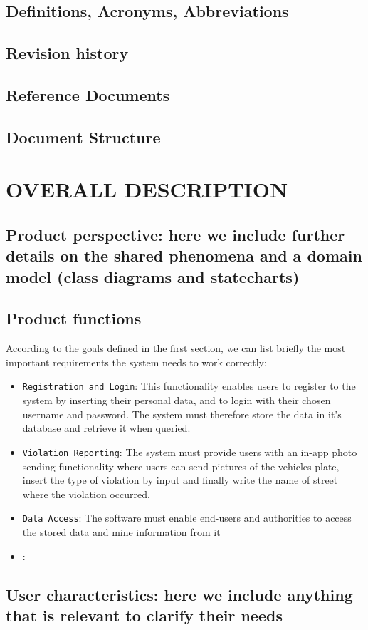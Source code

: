 \documentclass[12pt,a4paper]{article}
\begin{document}
\subsection{Definitions, Acronyms, Abbreviations} 
\subsection{Revision history} 
\subsection{Reference Documents} 
\subsection{Document Structure} 
\section{OVERALL DESCRIPTION}
\subsection{Product perspective: here we include  further details on the shared phenomena and a 
domain model (class diagrams and statecharts)} 
\subsection{Product functions} 
According to the goals defined in the first section, we can list briefly the most important requirements the system needs to work correctly:
\begin{itemize}
\item {\texttt{Registration and Login}}: This functionality enables users to register to the system by inserting their personal data, and to login with their chosen username and password. The system must therefore store the data in it's database and retrieve it when queried.  
\item {\texttt{Violation Reporting}}: The system must provide users with an in-app photo sending functionality where users can send pictures of the vehicles plate, insert the type of violation by input and finally write the name of street where the violation occurred.
\item {\texttt{Data Access}}: The software must enable end-users and authorities to access the stored data and mine information from it 
\item {\texttt{}}:
\end{itemize}
\subsection{User characteristics: here we include anything that is relevant to clarify their needs} 
\end{document}
